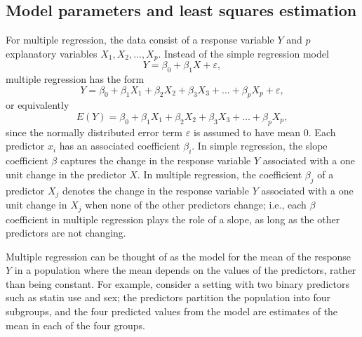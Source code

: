 \subsection{Model parameters and least squares estimation}

For multiple regression, the data consist of a response variable $Y$ and $p$ explanatory variables $X_1, X_2,\ldots, X_p$.   Instead of the simple regression model 
 $${Y} = \beta_{0} + \beta_{1}X + {\varepsilon},$$
 multiple regression has the form
 $${Y} = \beta_{0} +
     \beta_{1}X_{1} + \beta_{2}X_{2} + \beta_{3}X_{3} + \dots +
     \beta_{p}X_{p} + \varepsilon,$$
or equivalently
 $$E(Y) = \beta_{0} + 
     \beta_{1}X_{1} + \beta_{2}X_{2} + \beta_{3}X_{3} + \dots +
     \beta_{p}X_{p},
	 \label{multipleRegressionModel}
	 $$ 
since the normally distributed error term $\varepsilon$ is assumed to have mean 0. Each predictor $x_i$ has an associated coefficient $\beta_i$.  In simple regression, the slope coefficient $\beta$ captures the change in the response variable $Y$ associated with a one unit change in the predictor $X$.  In multiple regression, the coefficient $\beta_j$ of a predictor $X_j$ denotes the change in the response variable $Y$ associated with a one unit change in $X_j$ when none of the other predictors change; i.e., each $\beta$ coefficient in multiple regression plays the role of a slope, as long as the other predictors are not changing.

Multiple regression can be thought of as the model for the mean of the response $Y$ in a population where the mean depends on the values of the predictors, rather than being constant. For example, consider a setting with two binary predictors such as statin use and sex; the predictors partition the population into four subgroups, and the four predicted values from the model are estimates of the mean in each of the four groups.

\textD{\newpage}

